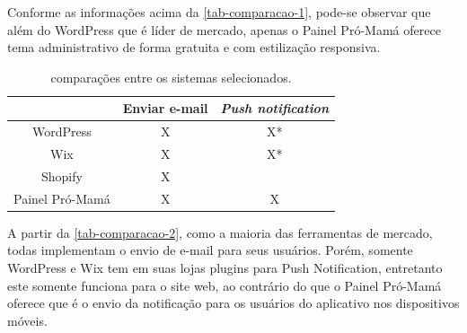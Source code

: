 Conforme as informações acima da \autoref{tab-comparacao-1}, pode-se observar que além do WordPress que é líder de mercado, apenas o Painel Pró-Mamá oferece tema administrativo de forma gratuita e com estilização responsiva.

\begin{table}[htb]
  \begin{center}
    \ABNTEXfontereduzida
    \caption{comparações entre os sistemas selecionados.}
    \label{tab-comparacao-2}
    \begin{tabular}{c|c|c}
      \phantom{.}     & \textbf{Enviar e-mail} & \textbf{\emph{Push notification}} \\
      \hline
      WordPress       & X                      & X*                                \\
      \hline
      Wix             & X                      &
      X*                                                                           \\
      \hline
      Shopify         & X                      & \phantom{.}                       \\
      \hline
      Painel Pró-Mamá & X                      & X                                 \\
    \end{tabular}
  \end{center}
\end{table}

A partir da \autoref{tab-comparacao-2}, como a maioria das ferramentas de mercado, todas implementam o envio de e-mail para seus usuários. Porém, somente WordPress e Wix tem em suas lojas plugins para Push Notification, entretanto este somente funciona para o site web, ao contrário do que o Painel Pró-Mamá oferece que é o envio da notificação para os usuários do aplicativo nos dispositivos móveis.

